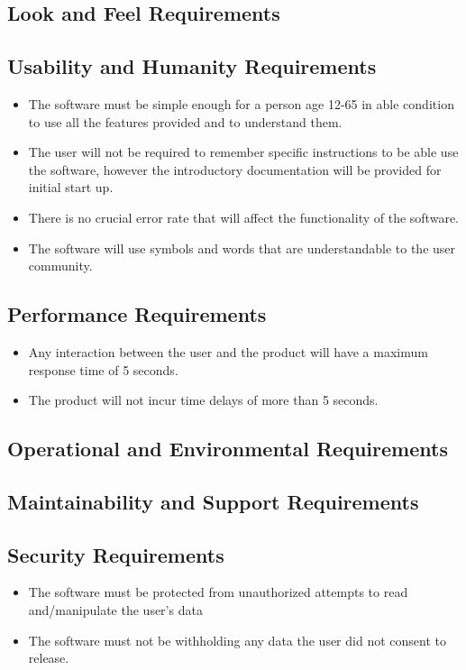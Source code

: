 \documentclass[12pt, titlepage]{article}
\begin{document}
\subsection{Look and Feel Requirements}

\subsection{Usability and Humanity Requirements}
\begin{itemize}
\item The software must be simple enough for a person age 12-65 in able condition to use all the features provided and to understand them. 
\item The user will not be required to remember specific instructions to be able use the software, however the introductory documentation will be provided for initial start up.
\item There is no crucial error rate that will affect the functionality of the software. 
\item The software will use symbols and words that are understandable to the user community. 
\end{itemize}

\subsection{Performance Requirements}
\begin{itemize}
\item Any interaction between the user and the product will have a maximum response time of 5 seconds. 
\item The product will not incur time delays of more than 5 seconds. 
\end{itemize}
\subsection{Operational and Environmental Requirements}

\subsection{Maintainability and Support Requirements}

\subsection{Security Requirements}
\begin{itemize}
\item The software must be protected from unauthorized attempts to read and/manipulate the user’s data
\item The software must not be withholding any data the user did not consent to release.
\end{itemize}
\end{document}
